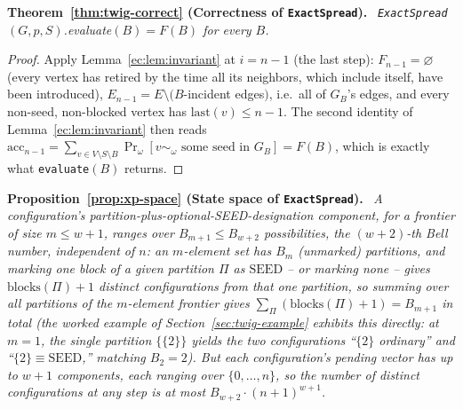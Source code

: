 \documentclass[ASNA,number]{USG}
\newcommand{\FF}{F}
\newenvironment{repeattheorem}[1][]{\par\medskip\noindent\textbf{#1.}\ \itshape}{\par\medskip}
\newenvironment{repeatproposition}[1][]{\par\medskip\noindent\textbf{#1.}\ \itshape}{\par\medskip}
\begin{document}
\begin{repeattheorem}[Theorem~\ref{thm:twig-correct} (Correctness of \texttt{ExactSpread})]
\texttt{ExactSpread}$(G,p,S)$.evaluate$(B)=\FF(B)$ for every $B$.
\end{repeattheorem}
\begin{proof}
Apply Lemma~\ref{ec:lem:invariant} at $i=n-1$ (the last step): $F_{n-1}
=\varnothing$ (every vertex has retired by the time all its neighbors,
which include itself, have been introduced), $E_{n-1}=E\setminus(B$-incident
edges$)$, i.e.\ all of $G_B$'s edges, and every non-seed, non-blocked
vertex has $\mathrm{last}(v)\le n-1$. The second identity of
Lemma~\ref{ec:lem:invariant} then reads $\mathrm{acc}_{n-1}=
\sum_{v\in V\setminus S\setminus B}\Pr_\omega[v\sim_\omega\text{ some seed
in }G_B]=\FF(B)$, which is exactly what \texttt{evaluate}$(B)$
returns.
\end{proof}

\begin{repeatproposition}[Proposition~\ref{prop:xp-space} (State space of \texttt{ExactSpread})]
A configuration's partition-plus-optional-SEED-designation component,
for a frontier of size $m\le w+1$, ranges over $B_{m+1}\le B_{w+2}$
possibilities, the $(w+2)$-th Bell number, independent of $n$: an
$m$-element set has $B_m$ (unmarked) partitions, and marking one block of a
given partition $\Pi$ as $\mathrm{SEED}$ -- or marking none -- gives
$\mathrm{blocks}(\Pi)+1$ distinct configurations from that one partition, so
summing over all partitions of the $m$-element frontier gives
$\sum_\Pi(\mathrm{blocks}(\Pi)+1)=B_{m+1}$ in total (the worked example of
Section~\ref{sec:twig-example} exhibits this directly: at $m=1$, the single
partition $\{\{2\}\}$ yields the two configurations ``$\{2\}$ ordinary'' and
``$\{2\}\equiv\mathrm{SEED}$,'' matching $B_2=2$). But each configuration's
pending vector has up to $w+1$ components, each ranging over
$\{0,\dots,n\}$, so the number of distinct configurations at any step is at
most $B_{w+2}\cdot(n+1)^{w+1}$.
\end{repeatproposition}
\end{document}
